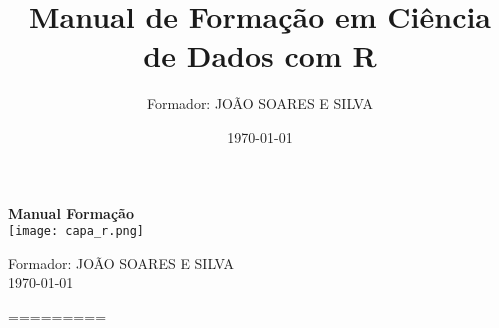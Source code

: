 \documentclass[12pt,a4paper]{article}
\title{\textbf{Manual de Formação em Ciência de Dados com R}}
\author{Formador: JOÃO SOARES E SILVA}
\date{\today}
\begin{document}
\begin{titlepage}
    \centering
    \vspace*{1cm} %
    {\color{sectionred}\huge\textbf{ Manual Formação}} \\
    \vspace{0.5cm}
    \texttt{[image: capa\_r.png]} %
    \vspace{1cm} %

    {\large Formador: JOÃO SOARES E SILVA} \\
    \vspace{0.5cm}
    {\today}
\end{titlepage}

\maketitle
\tableofcontents
\newpage











=========







\end{document}
